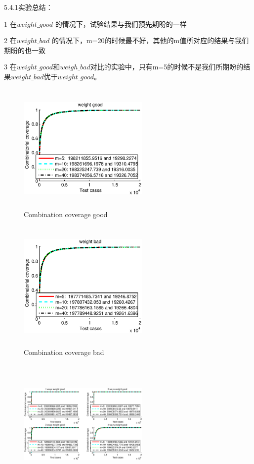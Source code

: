 \documentclass[10pt,journal,letterpaper,compsoc]{IEEEtran}
\begin{document}
\begin{CJK}{UTF8}{gkai}
5.4.1实验总结：

1 在$weight\_good$ 的情况下，试验结果与我们预先期盼的一样

2 在$weight\_bad$ 的情况下，m=20的时候最不好，其他的m值所对应的结果与我们期盼的也一致

3 在$weight\_good$和$weigh\_bad$对比的实验中，只有m=5的时候不是我们所期盼的结果$weight\_bad$优于$weight\_good$。

 \begin{figure}[htb]
   \centering
   \includegraphics[width=2.5in,height=2.5in]{./a1_picture/combination_coverage_good.eps}
   \caption{Combination coverage good}
   \label{fig:ARCH}
 \end{figure}
 \begin{figure}[htb]
   \centering
   \includegraphics[width=2.5in,height=2.5in]{./a1_picture/combination_coverage_bad.eps}
   \caption{Combination coverage bad}
   \label{fig:ARCH}
 \end{figure}
 \begin{figure}[htb]
   \centering
   \includegraphics[width=2.5in,height=2.5in]{./a1_picture/i_ways_combinatio_coverage_good.eps}

\end{figure}
\end{CJK}
\end{document}
